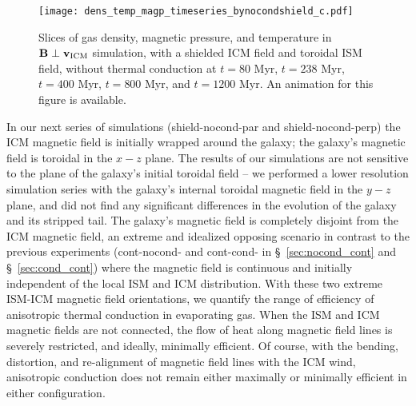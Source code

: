 \documentclass[twocolumn]{aastex6}
\begin{document}
\begin{figure*}[!htbp]
  \begin{center}
    {\texttt{[image: dens\_temp\_magp\_timeseries\_bynocondshield\_c.pdf]}}
     \caption{Slices of gas density, magnetic pressure, and temperature in $\mathbf{B} \perp \mathbf{v_{\rm ICM}}$ simulation, with a shielded ICM field and toroidal ISM field, without thermal conduction at $t = 80$ Myr, $t = 238$ Myr, $t = 400$ Myr, $t = 800$ Myr, and $t = 1200$ Myr. An animation for this figure is available. \label{fig:bynocondshield}}
  \end{center}  
\end{figure*}

In our next series of simulations (shield-nocond-par and shield-nocond-perp) the ICM magnetic field is initially wrapped around the galaxy; the galaxy's magnetic field is toroidal in the $x-z$ plane. The results of our simulations are not sensitive to the plane of the galaxy's initial toroidal field  -- we performed a lower resolution simulation series with the galaxy's internal toroidal magnetic field in the $y-z$ plane, and did not find any significant differences in the evolution of the galaxy and its stripped tail. The galaxy's magnetic field is completely disjoint from the ICM magnetic field, an extreme and idealized opposing scenario in contrast to the previous experiments (cont-nocond- and cont-cond- in \S~\ref{sec:nocond_cont} and \S~\ref{sec:cond_cont}) where the magnetic field is continuous and initially independent of the local ISM and ICM distribution. With these two extreme ISM-ICM magnetic field orientations, we quantify the range of efficiency of anisotropic thermal conduction in evaporating gas. When the ISM and ICM magnetic fields are not connected, the flow of heat along magnetic field lines is severely restricted, and ideally, minimally efficient. Of course, with the bending, distortion, and re-alignment of magnetic field lines with the ICM wind, anisotropic conduction does not remain either  maximally or minimally efficient in either configuration. 
\end{document}
